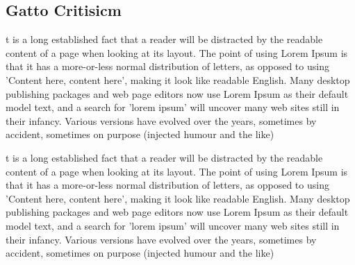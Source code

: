 \documentclass[]{article}
\begin{document}
 \subsection[Gatto Critisicm]{Gatto Critisicm}
 t is a long established fact that a reader will be distracted by the readable content of a page when looking at its layout. The point of using Lorem Ipsum is that it has a more-or-less normal distribution of letters, as opposed to using 'Content here, content here', making it look like readable English. Many desktop publishing packages and web page editors now use Lorem Ipsum as their default model text, and a search for 'lorem ipsum' will uncover many web sites still in their infancy. Various versions have evolved over the years, sometimes by accident, sometimes on purpose (injected humour and the like)

t is a long established fact that a reader will be distracted by the readable content of a page when looking at its layout. The point of using Lorem Ipsum is that it has a more-or-less normal distribution of letters, as opposed to using 'Content here, content here', making it look like readable English. Many desktop publishing packages and web page editors now use Lorem Ipsum as their default model text, and a search for 'lorem ipsum' will uncover many web sites still in their infancy. Various versions have evolved over the years, sometimes by accident, sometimes on purpose (injected humour and the like)
\end{document}
